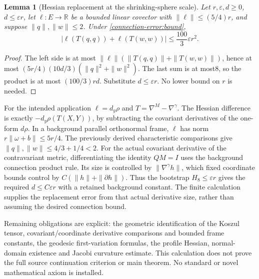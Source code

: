 \documentclass[11pt]{article}
\newtheorem{lemma}[theorem]{Lemma}
\theoremstyle{definition}
\theoremstyle{remark}
\numberwithin{equation}{section}
\begin{document}
\begin{lemma}[Hessian replacement at the shrinking-sphere scale]
Let $r,\varepsilon,d\ge0$, $d\le\varepsilon r$, let $\ell:E\to\mathbb R$
be a bounded linear covector with $\|\ell\|\le(5/4)r$, and suppose
$\|q\|,\|w\|\le2$. Under \eqref{connection-error:bound},
\[
 |\ell(T(q,q))+\ell(T(w,w))|
      \le\frac{100}{3}\varepsilon r^2.
\]
\end{lemma}
\begin{proof}
The left side is at most
$\|\ell\|(\|T(q,q)\|+\|T(w,w)\|)$, hence at most
$(5r/4)(10d/3)(\|q\|^2+\|w\|^2)$.
The last sum is at most8, so the product is at most $(100/3)rd$.
Substitute $d\le\varepsilon r$. No lower bound on $r$ is needed.
\end{proof}

For the intended application $\ell=d_y\rho$ and
$T=\nabla^M-\nabla^\gamma$. The Hessian difference is exactly
$-d_y\rho(T(X,Y))$, by subtracting the covariant derivatives of the
one-form $d\rho$. In a background parallel orthonormal frame,
$\ell$ has norm $r\|\omega+b\|\le5r/4$. The previously derived
characteristic comparisons give $\|q\|,\|w\|\le4/3+1/4<2$.
For the actual covariant derivative of the contravariant metric, differentiating
the identity $QM=I$ uses the background connection product rule. Its size is
controlled by $\|\nabla^\gamma h\|$, which fixed coordinate bounds control
by $C(\|h\|+\|\partial h\|)$. Thus the bootstrap $H_8\le\varepsilon r$
gives the required $d\le C\varepsilon r$ with a retained background
constant. The finite calculation supplies the replacement error from that
actual derivative size, rather than assuming the desired connection bound.

Remaining obligations are explicit: the geometric identification of the
Koszul tensor, covariant/coordinate derivative comparisons and bounded frame
constants, the geodesic first-variation formulas, the profile Hessian,
normal-domain existence and Jacobi curvature estimate. This calculation does
not prove the full source continuation criterion or main theorem. No standard
or novel mathematical axiom is installed.
\end{document}
